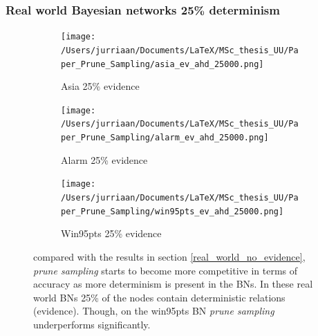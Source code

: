 \documentclass[a4paper, twoside, 11pt]{report}
\theoremstyle{plain}
\theoremstyle{definition}
\theoremstyle{remark}
\newcommand{\ps}{\textit{prune sampling }}
\begin{document}
\newpage
\subsubsection{Real world Bayesian networks 25\% determinism}

\begin{figure}[H]
\centering
\begin{subfigure}{0.5\textwidth}
\texttt{[image: /Users/jurriaan/Documents/LaTeX/MSc\_thesis\_UU/Paper\_Prune\_Sampling/asia\_ev\_ahd\_25000.png]}
\caption{Asia 25\% evidence}%
\label{asia}%
\end{subfigure}\hfill%
\begin{subfigure}{0.5\textwidth}
\texttt{[image: /Users/jurriaan/Documents/LaTeX/MSc\_thesis\_UU/Paper\_Prune\_Sampling/alarm\_ev\_ahd\_25000.png]}
\caption{Alarm 25\% evidence}%
\label{alarm}%
\end{subfigure}%
\begin{subfigure}{0.5\textwidth}
\texttt{[image: /Users/jurriaan/Documents/LaTeX/MSc\_thesis\_UU/Paper\_Prune\_Sampling/win95pts\_ev\_ahd\_25000.png]}
\caption{Win95pts 25\% evidence}%
\label{win95pts}%
\end{subfigure}\hfill%
\vspace{0.75pc}
\caption{compared with the results in section \ref{real_world_no_evidence}, \ps starts to become more competitive in terms of accuracy as more determinism is present in the BNs. In these real world BNs 25\% of the nodes contain deterministic relations (evidence). Though, on the win95pts BN \ps underperforms significantly.}
\label{results2}
\end{figure}

\newpage
\end{document}
